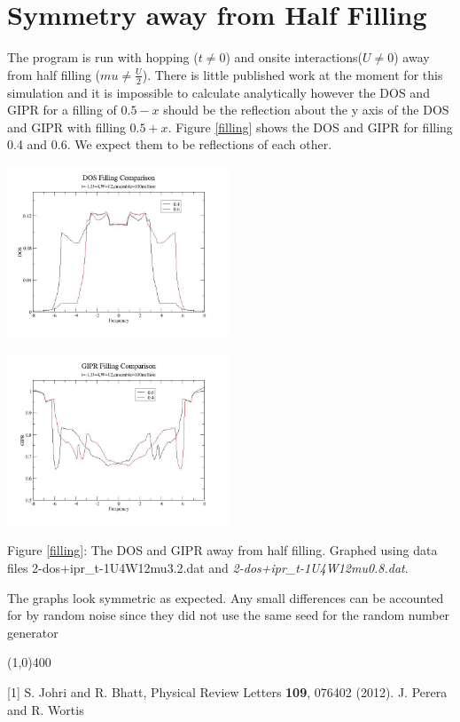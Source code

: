 \documentclass{article}
\begin{document}
\section{Symmetry away from Half Filling}
The program is run with hopping ($t\ne0$) and onsite interactions($U\ne0$) away from half filling ($mu\ne\frac{U}{2}$). There is little published work at the moment for this simulation and it is impossible to calculate analytically however the DOS and GIPR for a filling of $0.5-x$ should be the reflection about the y axis of the DOS and GIPR with filling $0.5+x$. Figure \ref{filling} shows the DOS and GIPR for filling 0.4 and 0.6. We expect them to be reflections of each other.
\begin{multicols}{2}
\begin{center} \label{filling}
	\includegraphics[width=250px]{dos_comparef.jpg} \\ 
\end{center}
\begin{center}
	\includegraphics[width=250px]{gipr_comparef.jpg} \\
\end{center}
\end{multicols}
\begin{center}
Figure \ref{filling}: The DOS and GIPR away from half filling. Graphed using data files {2-dos+ipr\_t-1U4W12mu3.2.dat} and \textit{2-dos+ipr\_t-1U4W12mu0.8.dat}.
\end{center}
The graphs look symmetric as expected. Any small differences can be accounted for by random noise since they did not use the same seed for the random number generator
\begin{center}
	\line(1,0){400}
\end{center}
[1] S. Johri and R. Bhatt, Physical Review Letters \textbf{109}, 076402 (2012). \newline
[2] J. Perera and R. Wortis
\end{document}
